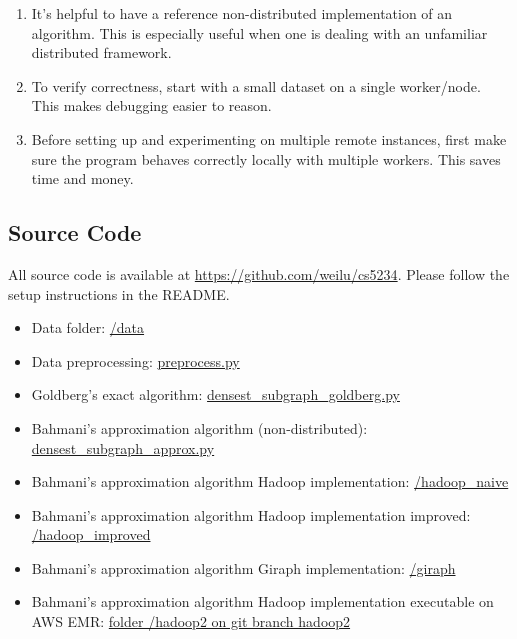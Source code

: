 \documentclass{article}
\begin{document}
\begin{enumerate}
  \item It's helpful to have a reference non-distributed implementation of an algorithm. This is especially useful when one is dealing with an unfamiliar distributed framework.
  \item To verify correctness, start with a small dataset on a single worker/node. This makes debugging easier to reason.
  \item Before setting up and experimenting on multiple remote instances, first make sure the program behaves correctly locally with multiple workers. This saves time and money.
\end{enumerate}

\newpage

\begin{appendices}
\section{Source Code}
All source code is available at \url{https://github.com/weilu/cs5234}. Please follow the setup instructions in the README.

\begin{itemize}
  \item Data folder: \href{https://github.com/weilu/cs5234/tree/master/data}{/data}
  \item Data preprocessing: \href{https://github.com/weilu/cs5234/blob/master/preprocess.py}{preprocess.py}
  \item Goldberg's exact algorithm: \href{https://github.com/weilu/cs5234/blob/master/densest_subgraph_goldberg.py}{densest\_subgraph\_goldberg.py}
  \item Bahmani's approximation algorithm (non-distributed): \href{https://github.com/weilu/cs5234/blob/master/densest_subgraph_approx.py}{densest\_subgraph\_approx.py}
  \item Bahmani's approximation algorithm Hadoop implementation: \href{https://github.com/weilu/cs5234/tree/master/hadoop_naive}{/hadoop\_naive}
  \item Bahmani's approximation algorithm Hadoop implementation improved: \href{https://github.com/weilu/cs5234/tree/master/hadoop_improved}{/hadoop\_improved}
  \item Bahmani's approximation algorithm Giraph implementation: \href{https://github.com/weilu/cs5234/tree/master/giraph/}{/giraph}
  \item Bahmani's approximation algorithm Hadoop implementation executable on AWS EMR: \href{https://github.com/weilu/cs5234/tree/hadoop2/hadoop2}{folder /hadoop2 on git branch hadoop2}
\end{itemize}
\end{appendices}

\newpage

{}

\end{document}
